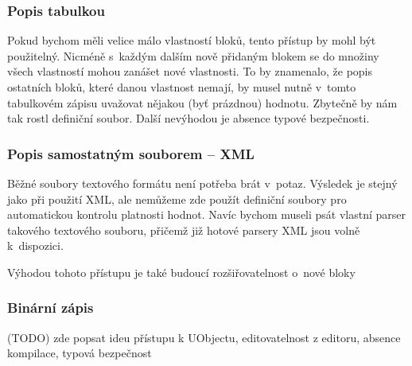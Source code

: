 \subsubsection{Popis tabulkou}
Pokud bychom měli velice málo vlastností bloků, tento přístup by mohl být použitelný. Nicméně s~každým dalším nově přidaným blokem se do množiny všech vlastností mohou zanášet nové vlastnosti.  To by znamenalo, že popis ostatních bloků, které danou vlastnost nemají, by musel nutně v~tomto tabulkovém zápisu uvažovat nějakou (byť prázdnou) hodnotu. Zbytečně by nám tak rostl definiční soubor. Další nevýhodou je absence typové bezpečnosti. 

\subsubsection{Popis samostatným souborem -- XML}
Běžné soubory textového formátu není potřeba brát v~potaz. Výsledek je stejný jako při použití XML, ale nemůžeme zde použít definiční soubory pro automatickou kontrolu platnosti hodnot. Navíc bychom museli psát vlastní parser takového textového souboru, přičemž již hotové parsery XML jsou volně k~dispozici. 

Výhodou tohoto přístupu je také budoucí rozšiřovatelnost o~nové bloky

\subsubsection{Binární zápis}
(TODO) zde popsat ideu přístupu k UObjectu, editovatelnost z editoru, absence kompilace, typová bezpečnost




